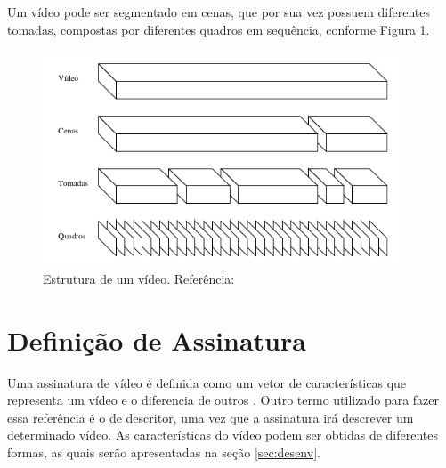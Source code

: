     
    Um vídeo pode ser segmentado em cenas, que por sua vez possuem diferentes tomadas, compostas por diferentes quadros em sequência, conforme Figura \ref{fig:video}. 
    
    
 
    
    \begin{figure}[h]
        \centering
        \includegraphics[width=0.96\textwidth]{dados/figuras/video.png}
        \caption{Estrutura de um vídeo. Referência: \citeauthor{santos2004segmentaccao}}
    	\label{fig:video}
    \end{figure}

  	\section{Definição de Assinatura}
    \label{sec:signature}
    
    	Uma assinatura de vídeo é definida como um vetor de características que representa um vídeo e o diferencia de outros \citeauthor{lee2008robust}. Outro termo utilizado para fazer essa referência é o de descritor, uma vez que a assinatura irá descrever um determinado vídeo. As características do vídeo podem ser obtidas de diferentes formas, as quais serão apresentadas na seção \ref{sec:desenv}.
        
